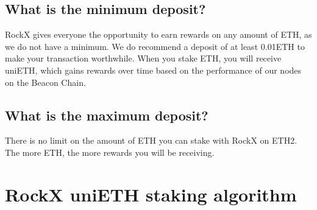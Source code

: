 \documentclass{article}
\begin{document}
\subsection{What is the minimum deposit?}
RockX gives everyone the opportunity to earn rewards on any amount of ETH, as we do not have a minimum. We do recommend a deposit of at least 0.01ETH to make your transaction worthwhile. When you stake ETH, you will receive uniETH, which gains rewards over time based on the performance of our nodes on the Beacon Chain.

\subsection{What is the maximum deposit?}
There is no limit on the amount of ETH you can stake with RockX on ETH2. The more ETH, the more rewards you will be receiving.

\section{RockX uniETH staking algorithm}
\end{document}
